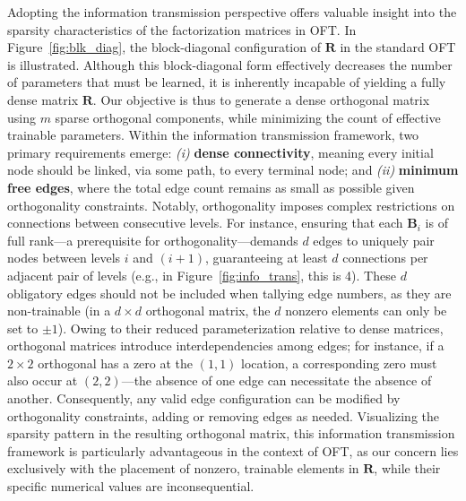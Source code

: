 Adopting the information transmission perspective offers valuable insight into the sparsity characteristics of the factorization matrices in OFT. In Figure~\ref{fig:blk_diag}, the block-diagonal configuration of $\bm{R}$ in the standard OFT is illustrated. Although this block-diagonal form effectively decreases the number of parameters that must be learned, it is inherently incapable of yielding a fully dense matrix $\bm{R}$. Our objective is thus to generate a dense orthogonal matrix using $m$ sparse orthogonal components, while minimizing the count of effective trainable parameters. Within the information transmission framework, two primary requirements emerge: \emph{(i)} \textbf{dense connectivity}, meaning every initial node should be linked, via some path, to every terminal node; and \emph{(ii)} \textbf{minimum free edges}, where the total edge count remains as small as possible given orthogonality constraints. Notably, orthogonality imposes complex restrictions on connections between consecutive levels. For instance, ensuring that each $\bm{B}_i$ is of full rank—a prerequisite for orthogonality—demands $d$ edges to uniquely pair nodes between levels $i$ and $(i+1)$, guaranteeing at least $d$ connections per adjacent pair of levels (e.g., in Figure~\ref{fig:info_trans}, this is 4). These $d$ obligatory edges should not be included when tallying edge numbers, as they are non-trainable (in a $d \times d$ orthogonal matrix, the $d$ nonzero elements can only be set to $\pm 1$). Owing to their reduced parameterization relative to dense matrices, orthogonal matrices introduce interdependencies among edges; for instance, if a $2\times2$ orthogonal has a zero at the $(1,1)$ location, a corresponding zero must also occur at $(2,2)$—the absence of one edge can necessitate the absence of another. Consequently, any valid edge configuration can be modified by orthogonality constraints, adding or removing edges as needed. Visualizing the sparsity pattern in the resulting orthogonal matrix, this information transmission framework is particularly advantageous in the context of OFT, as our concern lies exclusively with the placement of nonzero, trainable elements in $\bm{R}$, while their specific numerical values are inconsequential.

